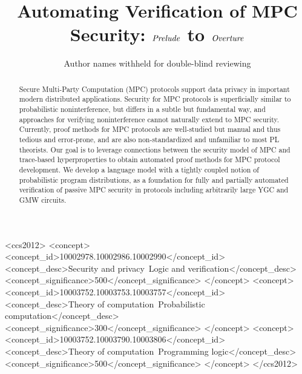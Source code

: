 \documentclass[acmsmall,screen,review]{acmart}
\begin{document}
\title{Automating Verification of MPC Security: $\mathit{Prelude}$ to $\mathit{Overture}$}

\author{Author names withheld for double-blind reviewing}

\begin{abstract}
Secure Multi-Party Computation (MPC) protocols support data privacy in
important modern distributed applications. Security for MPC protocols
is superficially similar to probabilistic noninterference, but differs
in a subtle but fundamental way, and approaches for verifying
noninterference cannot naturally extend to MPC security.  Currently,
proof methods for MPC protocols are well-studied but manual and thus
tedious and error-prone, and are also non-standardized and unfamiliar
to most PL theorists.  Our goal is to leverage connections between the
security model of MPC and trace-based hyperproperties to obtain
automated proof methods for MPC protocol development.  We develop a
language model with a tightly coupled notion of probabilistic program
distributions, as a foundation for fully and partially automated
verification of passive MPC security in protocols including
arbitrarily large YGC and GMW circuits.
\end{abstract}

\begin{CCSXML}
<ccs2012>
   <concept>
       <concept_id>10002978.10002986.10002990</concept_id>
       <concept_desc>Security and privacy~Logic and verification</concept_desc>
       <concept_significance>500</concept_significance>
       </concept>
   <concept>
       <concept_id>10003752.10003753.10003757</concept_id>
       <concept_desc>Theory of computation~Probabilistic computation</concept_desc>
       <concept_significance>300</concept_significance>
       </concept>
   <concept>
       <concept_id>10003752.10003790.10003806</concept_id>
       <concept_desc>Theory of computation~Programming logic</concept_desc>
       <concept_significance>500</concept_significance>
       </concept>
 </ccs2012>
\end{CCSXML}



\end{document}
